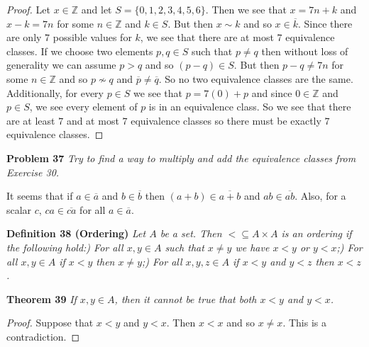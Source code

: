 \documentclass{article}
\begin{document}
\begin{flushleft}
\begin{proof}
Let $x \in \mathbb{Z}$ and let $S = \{0,1,2,3,4,5,6\}$. Then we see that $x = 7n+k$ and $x-k=7n$ for some $n \in \mathbb{Z}$ and $k \in S$. But then $x \sim k$ and so $x \in \overline{k}$. Since there are only $7$ possible values for $k$, we see that there are at most $7$ equivalence classes. If we choose two elements $p,q \in S$ such that $p \neq q$ then without loss of generality we can assume $p>q$ and so $(p-q) \in S$. But then $p-q \neq 7n$ for some $n \in \mathbb{Z}$ and so $p \nsim q$ and $\overline{p} \neq \overline{q}$. So no two equivalence classes are the same. Additionally, for every $p \in S$ we see that $p = 7(0) + p$ and since $0 \in \mathbb{Z}$ and $p \in S$, we see every element of $p$ is in an equivalence class. So we see that there are at least $7$ and at most $7$ equivalence classes so there must be exactly $7$ equivalence classes.
\end{proof}

\textbf{Problem 37}
\textsl{Try to find a way to multiply and add the equivalence classes from Exercise 30.}\newline

It seems that if $a \in \overline{a}$ and $b \in \overline{b}$ then $(a+b) \in \overline{a+b}$ and $ab \in \overline{ab}$. Also, for a scalar $c$, $ca \in \overline{ca}$ for all $a \in \overline{a}$.\newline

\textbf{Definition 38 (Ordering)}
\textsl{Let $A$ be a set. Then $< \subseteq A \times A$ is an ordering if the following hold:) For all $x,y \in A$ such that $x \neq y$ we have $x < y$ or $y < x$;) For all $x,y \in A$ if $x < y$ then $x \neq y$;) For all $x,y,z \in A$ if $x < y$ and $y < z$ then $x < z$.}\newline

\textbf{Theorem 39}
\textsl{If $x,y \in A$, then it cannot be true that both $x < y$ and $y < x$.}
\begin{proof}
Suppose that $x<y$ and $y<x$. Then $x<x$ and so $x \neq x$. This is a contradiction.
\end{proof}

\end{flushleft}
\end{document}
